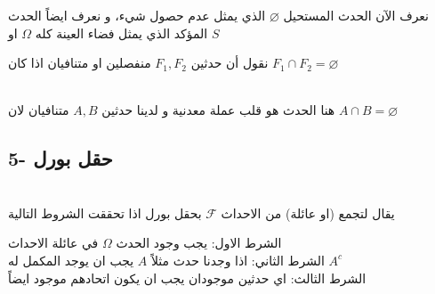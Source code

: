 \begin{note}
	نعرف الآن الحدث المستحيل \(\varnothing\) الذي يمثل عدم حصول شيء، و نعرف ايضاً الحدث المؤكد الذي يمثل فضاء العينة كله \(\Omega\) او \(S\)
\end{note}

\begin{definition}
	نقول أن حدثين \(F_1, F_2\) منفصلين  او متنافيان  اذا كان \(F_1 \cap F_2 = \varnothing\)
\end{definition}

\begin{example}
	\\
	هنا الحدث هو قلب عملة معدنية و لدينا حدثين \(A, B\) متنافيان لان \(A\cap B = \varnothing\)
\end{example}

\subsection*{5- حقل بورل }

\begin{definition}
	\\
	يقال لتجمع (او عائلة) من الاحداث \(\mathcal{F}\) بحقل بورل اذا تحققت الشروط التالية
	\begin{flushleft}
	\end{flushleft}
\end{definition}

\begin{note}
	الشرط الاول: يجب وجود الحدث \(\Omega\) في عائلة الاحداث\\
	الشرط الثاني: اذا وجدنا حدث مثلاً \(A\) يجب ان يوجد المكمل له \(A^c\)\\
	الشرط الثالث: اي حدثين موجودان يجب ان يكون اتحادهم موجود ايضاً  
\end{note}


